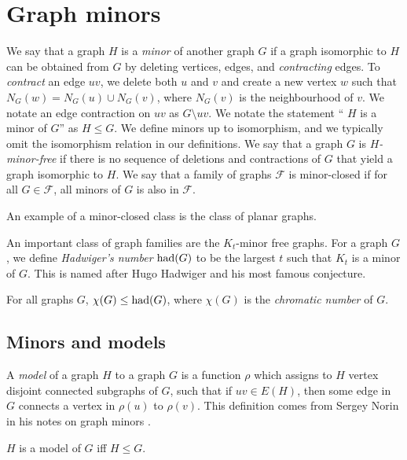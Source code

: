 \section{Graph minors}\label{sec:Graph Minors}
We say that a graph $H$ is a \textit{minor} of another graph $G$ if a graph isomorphic to $H$ can be obtained from $G$ by deleting vertices, edges, and \textit{contracting} edges. To \textit{contract} an edge $uv$, we delete both $u$ and $v$ and create a new vertex $w$ such that $N_G(w) = N_G(u) \cup N_G(v)$, where $N_G(v)$ is the neighbourhood of $v$. We notate an edge contraction on $uv$ as $G\setminus uv$.
We notate the statement `` $H$ is a minor of $G$'' as $H \leq G$. 
We define minors up to isomorphism, and we typically omit the isomorphism relation in our definitions. We say that a graph $G$ is \textit{$H$-minor-free} if there is no sequence of deletions and contractions of $G$ that yield a graph isomorphic to $H$. We say that a family of graphs $\mathcal{F}$ is minor-closed if for all $G \in \mathcal{F}$, all minors of $G$ is also in $\mathcal{F}$. 

\begin{example}
	An example of a minor-closed class is the class of planar graphs. 
\end{example}

An important class of graph families are the $K_t$-minor free graphs. For a graph $G$, we define \textit{Hadwiger's number} $\text{had}(G)$ to be the largest $t$ such that $K_t$ is a minor of $G$. This is named after Hugo Hadwiger and his most famous conjecture.

\begin{conjecture}\cite{hadwigerUeberKlassifikationStreckenkomplexe1943}
	For all graphs $G$, $\chi(G) \leq \text{had}(G)$, where $\chi(G)$ is the \textit{chromatic number} of $G$. 
\end{conjecture}

\subsection{Minors and models}
A \textit{model} of a graph $H$ to a graph $G$ is a function $\rho$ which assigns to $H$ vertex disjoint connected subgraphs of $G$, such that if $uv \in E(H)$, then some edge in $G$ connects a vertex in $\rho(u)$ to $\rho(v)$. This definition comes from Sergey Norin in his notes on graph minors \cite{norinMath599GraphMinors2017}. 

\begin{theorem}
	$H$ is a model of $G$ iff $ H \leq G$. 
\end{theorem}

